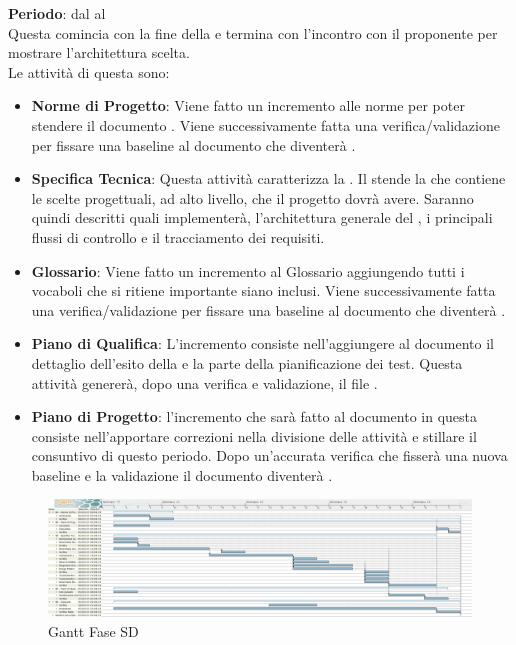 	\textbf{Periodo}: dal  al  \\Questa {} comincia con la fine della  e termina con l'incontro con il proponente per mostrare l'architettura scelta.\\
	Le attività di questa  sono:
	\begin{itemize}
		\item \textbf{Norme di Progetto}: Viene fatto un incremento alle norme per poter stendere il documento . Viene successivamente fatta una verifica/validazione per fissare una baseline al documento che diventerà .
		\item \textbf{Specifica Tecnica}: Questa attività caratterizza la . Il  stende la  che contiene le scelte progettuali, ad alto livello, che il progetto dovrà avere. Saranno quindi descritti quali  \projectname{} implementerà, l'architettura generale del , i principali flussi di controllo e il tracciamento dei requisiti.
		\item \textbf{Glossario}: Viene fatto un incremento al Glossario aggiungendo tutti i vocaboli che si ritiene importante siano inclusi. Viene successivamente fatta una verifica/validazione per fissare una baseline al documento che diventerà .
		\item \textbf{Piano di Qualifica}: L'incremento consiste nell'aggiungere al documento  il dettaglio dell'esito della  e la parte della pianificazione dei test. Questa attività genererà, dopo una verifica e validazione, il file .
		\item \textbf{Piano di Progetto}: l'incremento che sarà fatto al documento  in questa  consiste nell'apportare correzioni nella divisione delle attività e stillare il consuntivo di questo periodo. Dopo un'accurata verifica che fisserà una nuova baseline e la validazione il documento diventerà .
	\end{itemize}
	\begin{figure}[H]\centering
		\includegraphics[width=\textwidth]{PianoDiProgetto/Pics/FaseSD.png}
	\caption{Gantt Fase SD}
\end{figure}
